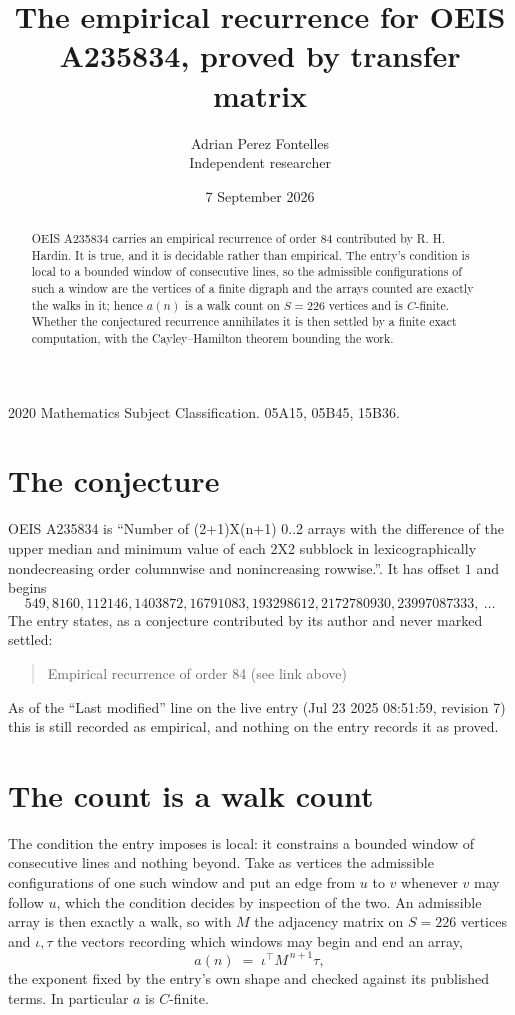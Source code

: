 \documentclass[11pt,a4paper]{article}
\title{The empirical recurrence for OEIS A235834, proved by transfer matrix}
\author{Adrian Perez Fontelles\\ \small Independent researcher}
\date{7 September 2026}
\theoremstyle{plain}
\theoremstyle{definition}
\begin{document}
\maketitle

\begin{abstract}
OEIS A235834 carries an empirical recurrence of order $84$ contributed by R. H. Hardin. It is
true, and it is decidable rather than empirical. The entry's condition is local to a bounded window of consecutive lines, so
the admissible configurations of such a window are the vertices of a finite digraph and the
arrays counted are exactly the walks in it; hence $a(n)$ is a walk count on $S=226$ vertices
and is $C$-finite. Whether the conjectured recurrence annihilates it is then settled by a
finite exact computation, with the Cayley--Hamilton theorem bounding the work.
\end{abstract}

\noindent\small 2020 Mathematics Subject Classification. 05A15, 05B45, 15B36.\normalsize

\section{The conjecture}

OEIS A235834 is ``Number of (2+1)X(n+1) 0..2 arrays with the difference of the upper median and minimum value of each 2X2 subblock in lexicographically nondecreasing order columnwise and nonincreasing rowwise.''. It has offset $1$ and begins
\[
549, 8160, 112146, 1403872, 16791083, 193298612, 2172780930, 23997087333,\ \dots
\]
The entry states, as a conjecture contributed by its author and never marked settled:
\begin{quote}
Empirical recurrence of order 84 (see link above)
\end{quote}
As of the ``Last modified'' line on the live entry (Jul 23 2025 08:51:59, revision 7) this is still
recorded as empirical, and nothing on the entry records it as proved.

\section{The count is a walk count}

The condition the entry imposes is local: it constrains a bounded window of consecutive lines and nothing beyond. Take as
vertices the admissible configurations of one such window and put an edge from $u$ to $v$
whenever $v$ may follow $u$, which the condition decides by inspection of the two. An
admissible array is then exactly a walk, so with $M$ the adjacency matrix on $S=226$ vertices
and $\iota,\tau$ the vectors recording which windows may begin and end an array,
\[
a(n)\;=\;\iota^{\!\top}M^{\,n+1}\tau ,
\]
the exponent fixed by the entry's own shape and checked against its published terms. In
particular $a$ is $C$-finite.
\end{document}
